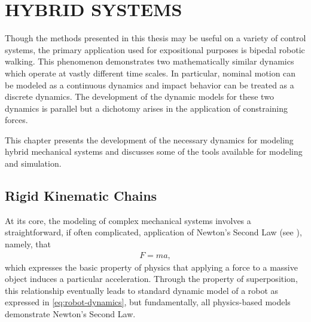 \chapter{\uppercase{Hybrid Systems}}

Though the methods presented in this thesis may be useful on a variety of control systems, the primary application used for expositional purposes is bipedal robotic walking.
%
This phenomenon demonstrates two mathematically similar dynamics which operate at vastly different time scales.
%
In particular, nominal motion can be modeled as a continuous dynamics and impact behavior can be treated as a discrete dynamics.
%
The development of the dynamic models for these two dynamics is parallel but a dichotomy arises in the application of constraining forces.

This chapter presents the development of the necessary dynamics for modeling hybrid mechanical systems and discusses some of the tools available for modeling and simulation.


\section{Rigid Kinematic Chains}
At its core, the modeling of complex mechanical systems involves a straightforward, if often complicated, application of Newton's Second Law (see \cite{feynman1963}), namely,
that
\begin{align}
  \label{eq:newtons-second}
  F = m a,
\end{align}
which expresses the basic property of physics that applying a force to a massive object induces a particular acceleration.
%
Through the property of superposition, this relationship eventually leads to standard dynamic model of a robot as expressed in \ref{eq:robot-dynamics}, but fundamentally, all physics-based models demonstrate Newton's Second Law.

